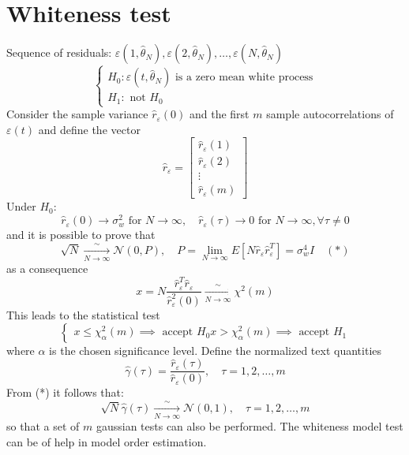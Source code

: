 \documentclass{book}
\begin{document}
\section{Whiteness test}
Sequence of residuals: $\varepsilon(1,\hat{\theta}_N),\varepsilon(2,\hat{\theta}_N),\dots,\varepsilon(N,\hat{\theta}_N)$
\[
    \begin{cases}
        H_0 : \varepsilon(t,\hat{\theta}_N) \text{ is a zero mean white process}\\
        H_1 : \text{ not } H_0
    \end{cases}
\]
Consider the sample variance $\hat{r}_\varepsilon(0)$ and the first $m$ sample autocorrelations of $\varepsilon(t)$ and define the vector
\[
    \hat{r}_\varepsilon = \begin{bmatrix}
        \hat{r}_\varepsilon(1)\\
        \hat{r}_\varepsilon(2)\\
        \vdots\\
        \hat{r}_\varepsilon(m)
    \end{bmatrix}
\]
Under $H_0$:
\[
    \hat{r}_\varepsilon(0)\to \sigma_w^2 \text{ for } N\to\infty,\quad \hat{r}_\varepsilon(\tau)\to 0 \text{ for } N\to\infty, \forall \tau \neq 0
\]
and it is possible to prove that
\[
    \sqrt{N}\xrightarrow[N\to\infty]\sim \mathcal{N}(0,P), \quad P=\lim_{N\to\infty} E[N\hat{r}_\varepsilon\hat{r}_\varepsilon^T]=\sigma_w^4I \quad (*)
\]
as a consequence
\[
    x=N\displaystyle\frac{\hat{r}_\varepsilon^T\hat{r}_\varepsilon}{\hat{r}_\varepsilon^2(0)}\xrightarrow[N\to\infty]\sim \chi^2(m)
\]
This leads to the statistical test
\[
    \begin{cases}
        x\leq \chi_\alpha^2(m) \implies \text{ accept }H_0
        x>\chi_\alpha^2(m) \implies \text{ accept }H_1
    \end{cases}
\]
where $\alpha$ is the chosen significance level. Define the normalized text quantities
\[
    \hat{\gamma}(\tau)=\displaystyle\frac{\hat{r}_\varepsilon(\tau)}{\hat{r}_\varepsilon(0)}, \quad \tau= 1,2,\dots,m
\]
From (*) it follows that:
\[
    \sqrt{N}\hat{\gamma}(\tau)\xrightarrow[N\to\infty]\sim \mathcal{N}(0,1), \quad \tau=1,2,\dots,m
\]
so that a set of $m$ gaussian tests can also be performed.
The whiteness model test can be of help in model order estimation. 
\end{document}
